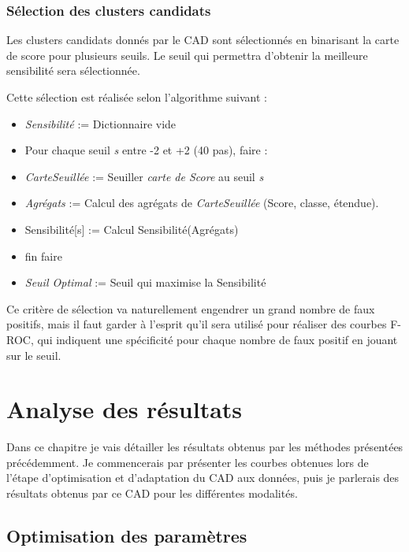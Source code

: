 \subsection{Sélection des clusters candidats}

Les clusters candidats donnés par le CAD sont sélectionnés en binarisant la carte de score pour plusieurs seuils. Le seuil qui permettra d'obtenir la meilleure sensibilité sera sélectionnée.

Cette sélection est réalisée selon l'algorithme suivant :

\begin{itemize}
 \item \emph{Sensibilité} := Dictionnaire vide
 \item Pour chaque seuil \emph{s} entre -2 et +2 (40 pas), faire :
 \item \hspace{1cm}\emph{CarteSeuillée} := Seuiller \emph{carte de Score} au seuil \emph{s}
 \item \hspace{1cm}\emph{Agrégats} := Calcul des agrégats de \emph{CarteSeuillée} (Score, classe, étendue).
 \item \hspace{1cm}Sensibilité[s] := Calcul Sensibilité(Agrégats)
 \item fin faire
 \item \emph{Seuil Optimal} := Seuil qui maximise la Sensibilité
\end{itemize}

Ce critère de sélection va naturellement engendrer un grand nombre de faux positifs, mais il faut garder à l'esprit qu'il sera utilisé pour réaliser des courbes F-ROC, qui indiquent une spécificité pour chaque nombre de faux positif en jouant sur le seuil.

\chapter{Analyse des résultats}

Dans ce chapitre je vais détailler les résultats obtenus par les méthodes présentées précédemment. Je commencerais par présenter les courbes obtenues lors de l'étape d'optimisation et d'adaptation du CAD aux données, puis je parlerais des résultats obtenus par ce CAD pour les différentes modalités.

\section{Optimisation des paramètres}


